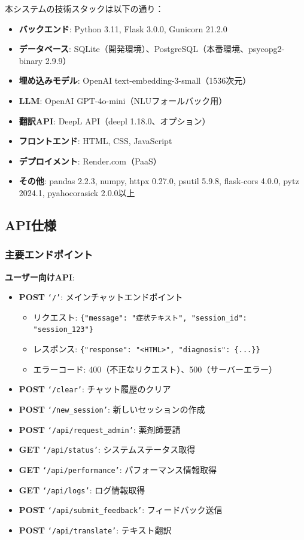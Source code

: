 \documentclass[a4paper,11pt,ja=standard,xelatex]{bxjsarticle}
\theoremstyle{definition}
\begin{document}
本システムの技術スタックは以下の通り：
\begin{itemize}
\item \textbf{バックエンド}: Python 3.11, Flask 3.0.0, Gunicorn 21.2.0
\item \textbf{データベース}: SQLite（開発環境）、PostgreSQL（本番環境、psycopg2-binary 2.9.9）
\item \textbf{埋め込みモデル}: OpenAI text-embedding-3-small（1536次元）
\item \textbf{LLM}: OpenAI GPT-4o-mini（NLUフォールバック用）
\item \textbf{翻訳API}: DeepL API（deepl 1.18.0、オプション）
\item \textbf{フロントエンド}: HTML, CSS, JavaScript
\item \textbf{デプロイメント}: Render.com（PaaS）
\item \textbf{その他}: pandas 2.2.3, numpy, httpx 0.27.0, psutil 5.9.8, flask-cors 4.0.0, pytz 2024.1, pyahocorasick 2.0.0以上
\end{itemize}

\subsection{API仕様}

\subsubsection{主要エンドポイント}

\textbf{ユーザー向けAPI}:
\begin{itemize}
\item \textbf{POST} \texttt{`/'}: メインチャットエンドポイント
  \begin{itemize}
  \item リクエスト: \texttt{\{"message": "症状テキスト", "session\_id": "session\_123"\}}
  \item レスポンス: \texttt{\{"response": "<HTML>", "diagnosis": \{...\}\}}
  \item エラーコード: 400（不正なリクエスト）、500（サーバーエラー）
  \end{itemize}
\item \textbf{POST} \texttt{`/clear'}: チャット履歴のクリア
\item \textbf{POST} \texttt{`/new\_session'}: 新しいセッションの作成
\item \textbf{POST} \texttt{`/api/request\_admin'}: 薬剤師要請
\item \textbf{GET} \texttt{`/api/status'}: システムステータス取得
\item \textbf{GET} \texttt{`/api/performance'}: パフォーマンス情報取得
\item \textbf{GET} \texttt{`/api/logs'}: ログ情報取得
\item \textbf{POST} \texttt{`/api/submit\_feedback'}: フィードバック送信
\item \textbf{POST} \texttt{`/api/translate'}: テキスト翻訳
\end{itemize}
\end{document}
